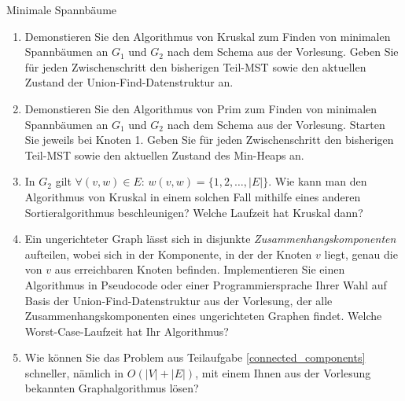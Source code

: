 \documentclass[11pt,a4paper]{article}
\begin{document}
\begin{aufgabe}{2}{Minimale Spannbäume}
\begin{figure}[h!]
\begin{subfigure}{0.38\textwidth}
        \end{subfigure}
    \end{figure}
    \FloatBarrier
    \begin{enumerate}[label=\alph*)]
        \item Demonstieren Sie den Algorithmus von Kruskal zum Finden von minimalen Spannbäumen an $G_1$ und $G_2$ nach dem Schema aus der Vorlesung.
        Geben Sie für jeden Zwischenschritt den bisherigen Teil-MST sowie den aktuellen Zustand der Union-Find-Datenstruktur an.
        \item Demonstieren Sie den Algorithmus von Prim zum Finden von minimalen Spannbäumen an $G_1$ und $G_2$ nach dem Schema aus der Vorlesung.
        Starten Sie jeweils bei Knoten 1.
        Geben Sie für jeden Zwischenschritt den bisherigen Teil-MST sowie den aktuellen Zustand des Min-Heaps an.
        \item In $G_2$ gilt $\forall (v, w) \in E$: $w(v, w) = \{1, 2, \ldots, |E|\}$.
        Wie kann man den Algorithmus von Kruskal in einem solchen Fall mithilfe eines anderen Sortieralgorithmus beschleunigen?
        Welche Laufzeit hat Kruskal dann?
        \item\label{connected_components}Ein ungerichteter Graph lässt sich in disjunkte \emph{Zusammenhangskomponenten} aufteilen, wobei sich in der Komponente, in der der Knoten $v$ liegt, genau die von $v$ aus erreichbaren Knoten befinden.
        Implementieren Sie einen Algorithmus in Pseudocode oder einer Programmiersprache Ihrer Wahl auf Basis der Union-Find-Datenstruktur aus der Vorlesung, der alle Zusammenhangskomponenten eines ungerichteten Graphen findet.
        Welche Worst-Case-Laufzeit hat Ihr Algorithmus?
        \item
        Wie können Sie das Problem aus Teilaufgabe \ref*{connected_components} schneller, nämlich in $O(|V| + |E|)$, mit einem Ihnen aus der Vorlesung bekannten Graphalgorithmus lösen?
    \end{enumerate}
\end{aufgabe}
\end{document}
